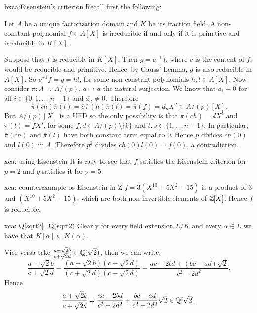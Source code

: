 \begin{sol}{bxca:Eisenstein's criterion}
Recall first the following:
\begin{lemma*}
    Let $A$ be a unique factorization domain and $K$ be its fraction field.
    A non-constant polynomial $f\in A[X]$ is irreducible if and only if it is primitive and irreducible in $K[X]$.
\end{lemma*}

    Suppose that $f$ is reducible in $K[X]$.
    Then $g=c^{-1}f$, where $c$ is the content of $f$,
    would be reducible and primitive.
    Hence, by Gauss' Lemma, $g$ is also 
    reducible in $A[X]$.
    So $c^{-1}f=g=hl$, for some non-constant polynomials $h,l\in A[X]$.
    Now consider $\pi:A\to A/(p)$, $a\mapsto \overline{a}$ the natural surjection.
    We know that $\overline{a_i}=0$ for all 
    $i\in\{0,1,\dots, n-1\}$ and $\overline{a_n}\neq 0$.
    Therefore 
    \[
    \overline{\pi}(ch)\overline{\pi}(l)=\overline{c}\:\overline{\pi}(h)\overline{\pi}(l)=\overline{\pi}(f)=\overline{a_n}X^n\in  A/(p)[X].
    \]
    But $A/(p)[X]$ is a UFD so the only possibility
    is that $\overline{\pi}(ch)=\overline{d}X^t$ and $\overline{\pi}(l)=\overline{f}X^s$, for
    some $f,d\in A/(p)\setminus\{\overline{0}\}$
    and $t,s\in\{1,\dots, n-1\}$.
    In particular, $\overline{\pi}(ch)$ and $\overline{\pi}(l)$ have both constant term 
    equal to 0.
    Hence $p$ divides $ch(0)$ and $l(0)$ in $A$.
    Therefore $p^2$ divides $ch(0)l(0)=f(0)$,
    a contradiction.
\end{sol}

\begin{sol}{xca: using Eisenstein}
It is easy to see that $f$ satisfies the Eisenstein criterion for $p=2$
and $g$ satisfies it for $p=5$. 
\end{sol}

\begin{sol}{xca: counterexample os Eisenstein in Z}
    $f=3(X^{10}+5X^2-15)$ is a product of $3$ and $(X^{10}+5X^2-15)$,
    which are both non-invertible elements of $\mathbb{Z}[X]$.
    Hence $f$ is reducible.
\end{sol}

\begin{sol}{xca: Q[sqrt2]=Q(sqrt2)}
Clearly for every field extension $L/K$ and 
    every $\alpha\in L$ we have that
    $K[\alpha]\subseteq K(\alpha)$.

    Vice versa take $\frac{a+\sqrt{2}b}{c+\sqrt{2}d}\in \mathbb{Q}(\sqrt{2})$,
    then we can write:
    \[
    \frac{a+\sqrt{2}b}{c+\sqrt{2}d}=\frac{(a+\sqrt{2}b)(c-\sqrt{2}d)}{(c+\sqrt{2}d)(c-\sqrt{2}d)}=
    \frac{ac-2bd+(bc-ad)\sqrt{2}}{c^2-2d^2}.
    \]
    Hence
    \[
    \frac{a+\sqrt{2}b}{c+\sqrt{2}d}=\frac{ac-2bd}{c^2-2d^2}+\frac{bc-ad}{c^2-2d^2}\sqrt{2}\in \mathbb{Q}[\sqrt{2}].
    \]
\end{sol}


